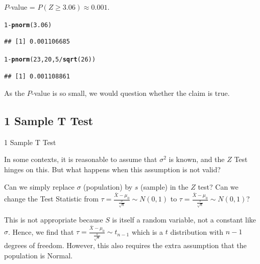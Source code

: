 \documentclass[t,xcolor=pdftex,dvipsnames,table]{beamer}\usepackage[]{graphicx}\usepackage[]{color}
\makeatletter
\newcommand{\hlnum}[1]{\textcolor[rgb]{0.686,0.059,0.569}{#1}}%
\newcommand{\hlopt}[1]{\textcolor[rgb]{0,0,0}{#1}}%
\newcommand{\hlstd}[1]{\textcolor[rgb]{0.345,0.345,0.345}{#1}}%
\newcommand{\hlkwd}[1]{\textcolor[rgb]{0.737,0.353,0.396}{\textbf{#1}}}%
\newenvironment{kframe}{%
 \def\at@end@of@kframe{}%
 \ifinner\ifhmode%
  \def\at@end@of@kframe{\end{minipage}}%
  \begin{minipage}{\columnwidth}%
 \fi\fi%
 \def\FrameCommand##1{\hskip\@totalleftmargin \hskip-\fboxsep
 \colorbox{shadecolor}{##1}\hskip-\fboxsep
     \hskip-\linewidth \hskip-\@totalleftmargin \hskip\columnwidth}%
 \MakeFramed {\advance\hsize-\width
   \@totalleftmargin\z@ \linewidth\hsize
   \@setminipage}}%
 {\par\unskip\endMakeFramed%
 \at@end@of@kframe}
\newenvironment{knitrout}{}{} %
\makeatother
\begin{document}
\begin{frame}[fragile]{}
 $P$-value = $P( Z \geq 3.06) \approx  0.001$.

\begin{knitrout}
\color{fgcolor}\begin{kframe}
\begin{alltt}
\hlnum{1}\hlopt{-}\hlkwd{pnorm}\hlstd{(}\hlnum{3.06}\hlstd{)}
\end{alltt}
\begin{verbatim}
## [1] 0.001106685
\end{verbatim}
\begin{alltt}
\hlnum{1}\hlopt{-}\hlkwd{pnorm}\hlstd{(}\hlnum{23}\hlstd{,}\hlnum{20}\hlstd{,}\hlnum{5}\hlopt{/}\hlkwd{sqrt}\hlstd{(}\hlnum{26}\hlstd{))}
\end{alltt}
\begin{verbatim}
## [1] 0.001108861
\end{verbatim}
\end{kframe}
\end{knitrout}

 As the $P$-value is so small, we would question whether the claim is true.
\end{frame}  





\subsection[T Test]{1 Sample T Test}
\begin{frame}[fragile]{1 Sample T Test}

In some contexts, it is reasonable to assume that $\sigma^2$ is known, and the $Z$ Test hinges on this. But what happens when this assumption is not valid? 

\vspace{.5cm} Can we simply replace $\sigma$ (population) by $s$ (sample) in the $Z$ test? 
Can we change the Test Statistic from $\tau = \frac{\bar{X} - \mu_{0}}{\frac{\sigma}{\sqrt{n}}} \sim N(0,1)$ 
to $\tau = \frac{\bar{X} - \mu_{0}}{\frac{s}{\sqrt{n}}} \sim N(0,1)$?

\vspace{.5cm}
This is not appropriate because $S$ is itself a random variable, not a constant like $\sigma$.  Hence, we find that
$\tau = \frac{\bar{X} - \mu_{0}}{\frac{s}{\sqrt{n}}} \sim t_{n-1}$
which is a $t$ distribution with $n-1$ degrees of freedom. However, this also requires the extra assumption that the population is Normal.
\end{frame}
\end{document}
